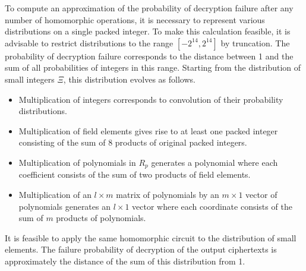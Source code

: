 To compute an approximation of the probability of decryption failure after any number of homomorphic operations, it is necessary to represent various distributions on a single packed integer. To make this calculation feasible, it is advisable to restrict distributions to the range $[-2^{14},2^{14}]$ by truncation. The probability of decryption failure corresponds to the distance between 1 and the sum of all probabilities of integers in this range. Starting from the distribution of small integers $\Xi$, this distribution evolves as follows.
\begin{itemize}
\item Multiplication of integers corresponds to convolution of their probability distributions.
\item Multiplication of field elements gives rise to at least one packed integer consisting of the sum of 8 products of original packed integers.
\item Multiplication of polynomials in $R_p$ generates a polynomial where each coefficient consists of the sum of two products of field elements.
\item Multiplication of an $l \times m$ matrix of polynomials by an $m \times 1$ vector of polynomials generates an $l \times 1$ vector where each coordinate consists of the sum of $m$ products of polynomials.
\end{itemize}
It is feasible to apply the same homomorphic circuit to the distribution of small elements. The failure probability of decryption of the output ciphertexts is approximately the distance of the sum of this distribution from 1.

